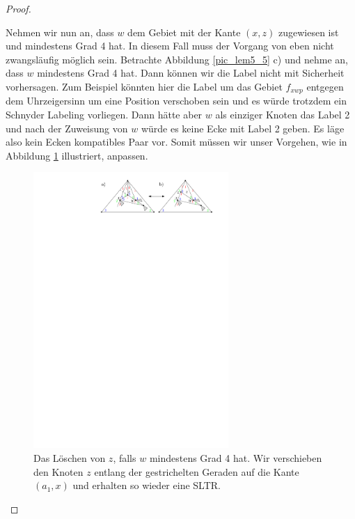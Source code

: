 \begin{proof}
\begin{description}[leftmargin =0pt, font = \rmfamily ,listparindent=\parindent,parsep=0pt]
Nehmen wir nun an, dass $w$ dem Gebiet mit der Kante $(x,z)$ zugewiesen ist und mindestens Grad 4 hat. In diesem Fall muss der Vorgang von eben nicht zwangsläufig möglich sein. Betrachte Abbildung \ref{pic_lem5_5} c) und nehme an, dass $w$ mindestens Grad 4 hat. Dann können wir die Label nicht mit Sicherheit vorhersagen. Zum Beispiel könnten hier die Label um das Gebiet $f_{xwp}$ entgegen dem Uhrzeigersinn um eine Position verschoben sein und es würde trotzdem ein Schnyder Labeling vorliegen. Dann hätte aber $w$ als einziger Knoten das Label 2 und nach der Zuweisung von $w$ würde es keine Ecke mit Label 2 geben. Es läge also kein Ecken kompatibles Paar vor. Somit müssen wir unser Vorgehen, wie in Abbildung \ref{pic_lem5_6} illustriert, anpassen.

\begin{figure}[h]
	\centering
	  \includegraphics[width=0.66\textwidth]{lem5_6.pdf}
    	\caption{Das Löschen von $z$, falls $w$ mindestens Grad 4 hat. Wir verschieben den Knoten $z$ entlang der gestrichelten Geraden auf die Kante $(a_1,x)$ und erhalten so wieder eine SLTR.}
    	\label{pic_lem5_6}
\end{figure}


\end{description}
\end{proof}
